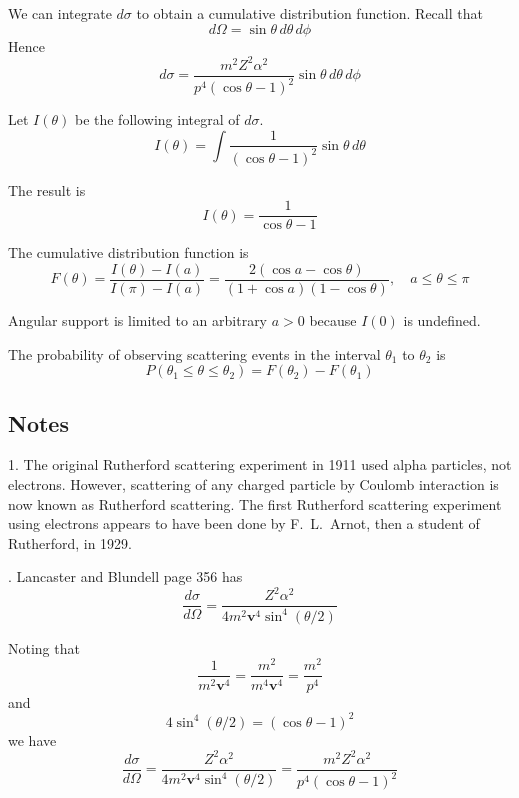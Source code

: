 \documentclass[12pt]{article}
\begin{document}
We can integrate $d\sigma$ to obtain a cumulative distribution function.
Recall that
\begin{equation*}
d\Omega=\sin\theta\,d\theta\,d\phi
\end{equation*}
Hence
\begin{equation*}
d\sigma=\frac{m^2Z^2\alpha^2}{p^4(\cos\theta-1)^2}\sin\theta\,d\theta\,d\phi
\end{equation*}

Let $I(\theta)$ be the following integral of $d\sigma$.
\begin{equation*}
I(\theta)
=\int\frac{1}{(\cos\theta-1)^2}\sin\theta\,d\theta
\end{equation*}

The result is
\begin{equation*}
I(\theta)=\frac{1}{\cos\theta-1}
\end{equation*}

The cumulative distribution function is
\begin{equation*}
F(\theta)=\frac{I(\theta)-I(a)}{I(\pi)-I(a)}
=\frac{2(\cos a-\cos\theta)}{(1+\cos a)(1-\cos\theta)},
\quad
a\le\theta\le\pi
\end{equation*}

Angular support is limited to an arbitrary $a>0$ because $I(0)$ is undefined.

\bigskip
The probability of observing scattering events
in the interval $\theta_1$ to $\theta_2$ is
\begin{equation*}
P(\theta_1\le\theta\le\theta_2)=F(\theta_2)-F(\theta_1)
\end{equation*}

\subsection*{Notes}
1. The original Rutherford scattering experiment in 1911 used alpha particles, not electrons.
However, scattering of any charged particle by Coulomb interaction
is now known as Rutherford scattering.
The first Rutherford scattering experiment using electrons appears to have
been done by F.~L.~Arnot, then a student of Rutherford, in 1929.

. Lancaster and Blundell page 356 has
\begin{equation*}
\frac{d\sigma}{d\Omega}
=\frac{Z^2\alpha^2}{4m^2\mathbf v^4\sin^4(\theta/2)}
\end{equation*}

Noting that
\begin{equation*}
\frac{1}{m^2\mathbf v^4}=\frac{m^2}{m^4\mathbf v^4}=\frac{m^2}{p^4}
\end{equation*}
and
\begin{equation*}
4\sin^4(\theta/2)=(\cos\theta-1)^2
\end{equation*}
we have
\begin{equation*}
\frac{d\sigma}{d\Omega}
=\frac{Z^2\alpha^2}{4m^2\mathbf v^4\sin^4(\theta/2)}
=\frac{m^2Z^2\alpha^2}{p^4(\cos\theta-1)^2}
\end{equation*}
\end{document}

